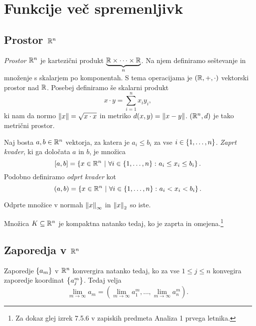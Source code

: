 
\section{Funkcije več spremenljivk}

\subsection{Prostor $\mathbb{R}^n$}

\begin{definicija}
\emph{Prostor $\mathbb{R}^n$} je kartezični produkt $\underbrace{\mathbb{R}\times\dots\times\mathbb{R}}_n$. Na njem definiramo seštevanje in množenje s skalarjem po komponentah. S tema operacijama je $(\mathbb{R},+,\cdot)$ vektorski prostor nad $\mathbb{R}$. Posebej definiramo še skalarni produkt
\[
x\cdot y=\sum_{i=1}^n x_iy_i,
\]
ki nam da normo $\left\lVert x\right\rVert=\sqrt{x\cdot x}$ in metriko $d(x,y)=\left\lVert x-y\right\rVert$. $(\mathbb{R}^n,d)$ je tako metrični prostor.
\end{definicija}

\begin{definicija}
Naj bosta $a,b\in\mathbb{R}^n$ vektorja, za katera je $a_i\leq b_i$ za vse $i\in\left\{1,\dots,n\right\}$. \emph{Zaprt kvader}, ki ga določata $a$ in $b$, je množica
\[
[a,b]=\left\{x\in\mathbb{R}^n~\middle\vert~\forall i\in\left\{1,\dots,n\right\}\colon a_i\leq x_i\leq b_i\right\}.
\]
Podobno definiramo \emph{odprt kvader} kot
\[
(a,b)=\left\{x\in\mathbb{R}^n~\middle\vert~\forall i\in\left\{1,\dots,n\right\}\colon a_i<x_i<b_i\right\}.
\]
\end{definicija}

\begin{opomba}
Odprte množice v normah $\left\lVert x\right\rVert_\infty$ in $\left\lVert x\right\rVert_2$ so iste.
\end{opomba}

\begin{izrek}
Množica $K\subseteq\mathbb{R}^n$ je kompaktna natanko tedaj, ko je zaprta in omejena.\footnote{Za dokaz glej izrek 7.5.6 v zapiskih predmeta Analiza 1 prvega letnika.}
\end{izrek}

\newpage

\subsection{Zaporedja v $\mathbb{R}^n$}

\begin{trditev}
Zaporedje $\left\{a_m\right\}$ v $\mathbb{R}^n$ konvergira natanko tedaj, ko za vse $1\leq j\leq n$ konvegira zaporedje koordinat $\left\{a_j^m\right\}$. Tedaj velja
\[
\lim_{m\to\infty} a_m=\left(\lim_{m\to\infty} a_1^m,\dots,\lim_{m\to\infty} a_n^m\right).
\]
\end{trditev}

